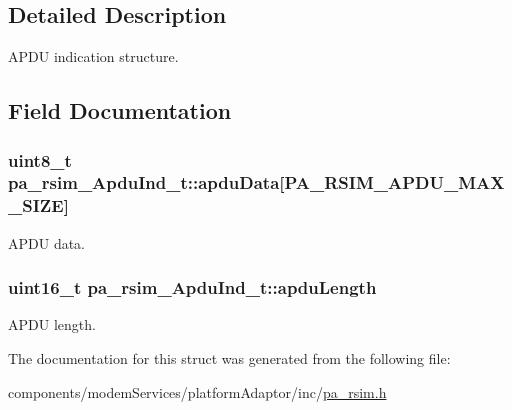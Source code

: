 \subsection{Detailed Description}
A\+P\+DU indication structure. 

\subsection{Field Documentation}
\subsubsection[{\texorpdfstring{apdu\+Data}{apduData}}]{\setlength{\rightskip}{0pt plus 5cm}uint8\+\_\+t pa\+\_\+rsim\+\_\+\+Apdu\+Ind\+\_\+t\+::apdu\+Data\mbox{[}{\bf P\+A\+\_\+\+R\+S\+I\+M\+\_\+\+A\+P\+D\+U\+\_\+\+M\+A\+X\+\_\+\+S\+I\+ZE}\mbox{]}}\hypertarget{structpa__rsim___apdu_ind__t_ab3a60e9c51bb1162704c6fa0ea835d37}{}\label{structpa__rsim___apdu_ind__t_ab3a60e9c51bb1162704c6fa0ea835d37}


A\+P\+DU data. 

\subsubsection[{\texorpdfstring{apdu\+Length}{apduLength}}]{\setlength{\rightskip}{0pt plus 5cm}uint16\+\_\+t pa\+\_\+rsim\+\_\+\+Apdu\+Ind\+\_\+t\+::apdu\+Length}\hypertarget{structpa__rsim___apdu_ind__t_a34c78b1223b92313960a0b1d489ced18}{}\label{structpa__rsim___apdu_ind__t_a34c78b1223b92313960a0b1d489ced18}


A\+P\+DU length. 



The documentation for this struct was generated from the following file\+:\begin{DoxyCompactItemize}
\item 
components/modem\+Services/platform\+Adaptor/inc/\hyperlink{pa__rsim_8h}{pa\+\_\+rsim.\+h}\end{DoxyCompactItemize}
